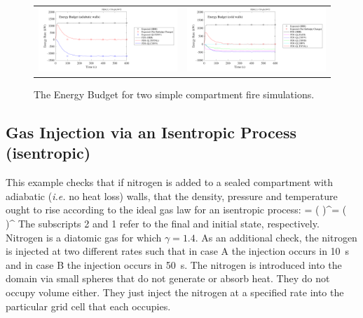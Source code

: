 \documentclass[11pt]{book}
\begin{document}
\begin{figure}[ht]
\begin{tabular*}{\textwidth}{lr}
\includegraphics[width=3.2in]{SCRIPT_FIGURES/energy_budget_adiabatic_walls} &
\includegraphics[width=3.2in]{SCRIPT_FIGURES/energy_budget_cold_walls}
\end{tabular*}
\caption[The energy budget cases.]{The Energy Budget for two simple compartment fire simulations.}
\label{energy_budget}
\end{figure}


\subsection{Gas Injection via an Isentropic Process (\texorpdfstring{{\bf isentropic}}{isentropic})}

This example checks that if nitrogen is added to a sealed compartment with adiabatic ({\em i.e.} no heat loss) walls, that the
density, pressure and temperature ought to rise according to the ideal gas law for an isentropic process:
\be {} = \left(  \right)^\gamma = \left(  \right)^{}  \ee
The subscripts 2 and 1 refer to the final and initial state, respectively. Nitrogen is a diatomic gas for which $\gamma=1.4$. As an additional
check, the nitrogen is injected at two different rates such that in case A the injection occurs in 10~s and in case B the injection occurs in
50~s. The nitrogen is introduced into the domain via small spheres that do not generate or absorb heat. They do not occupy volume either. They just
inject the nitrogen at a specified rate into the particular grid cell that each occupies.
\end{document}
